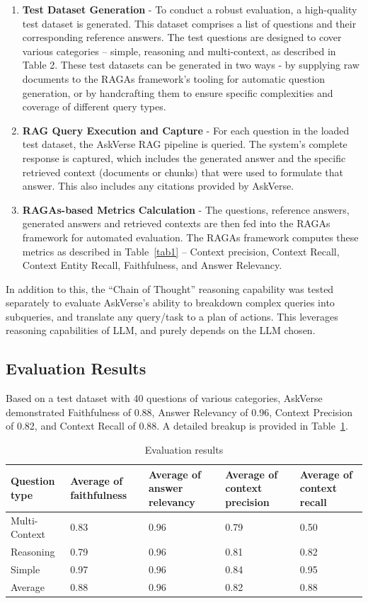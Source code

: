 \documentclass[default]{sn-jnl}%
\begin{document}
\begin{enumerate}
    \item \textbf{Test Dataset Generation} - To conduct a robust evaluation, a high-quality test dataset is generated. This dataset comprises a list of questions and their corresponding reference answers. The test questions are designed to cover various categories – simple, reasoning and multi-context, as described in Table 2. These test datasets can be generated in two ways - by supplying raw documents to the RAGAs framework's tooling for automatic question generation, or by handcrafting them to ensure specific complexities and coverage of different query types.
    \item \textbf{RAG Query Execution and Capture} - For each question in the loaded test dataset, the AskVerse RAG pipeline is queried. The system's complete response is captured, which includes the generated answer and the specific retrieved context (documents or chunks) that were used to formulate that answer. This also includes any citations provided by AskVerse.
    \item \textbf{RAGAs-based Metrics Calculation} - The questions, reference answers, generated answers and retrieved contexts are then fed into the RAGAs framework for automated evaluation. The RAGAs framework computes these metrics as described in Table~\ref{tab1} – Context precision, Context Recall, Context Entity Recall, Faithfulness, and Answer Relevancy.
\end{enumerate}

In addition to this, the ``Chain of Thought'' reasoning capability was tested separately to evaluate AskVerse’s ability to breakdown complex queries into subqueries, and translate any query/task to a plan of actions. This leverages reasoning capabilities of LLM, and purely depends on the LLM chosen.

\subsection*{Evaluation Results}
Based on a test dataset with 40 questions of various categories, AskVerse demonstrated Faithfulness of 0.88, Answer Relevancy of 0.96, Context Precision of 0.82, and Context Recall of 0.88. A detailed breakup is provided in Table~\ref{tab3}.

\begin{table}[h]
\caption{Evaluation results}\label{tab3}%
\renewcommand{\arraystretch}{1.2}
\setlength{\tabcolsep}{4pt}
\begin{tabular}{|p{3cm}|p{2cm}|p{2cm}|p{2cm}|p{2cm}|}
\hline
\textbf{Question type} & \textbf{Average of faithfulness} & \textbf{Average of answer relevancy} & \textbf{Average of context precision} & \textbf{Average of context recall} \\
\hline
Multi-Context & 0.83 & 0.96 & 0.79 & 0.50 \\
\hline
Reasoning & 0.79 & 0.96 & 0.81 & 0.82 \\
\hline
Simple & 0.97 & 0.96 & 0.84 & 0.95 \\
\hline
Average & 0.88 & 0.96 & 0.82 & 0.88 \\
\hline
\end{tabular}
\end{table}
\end{document}
